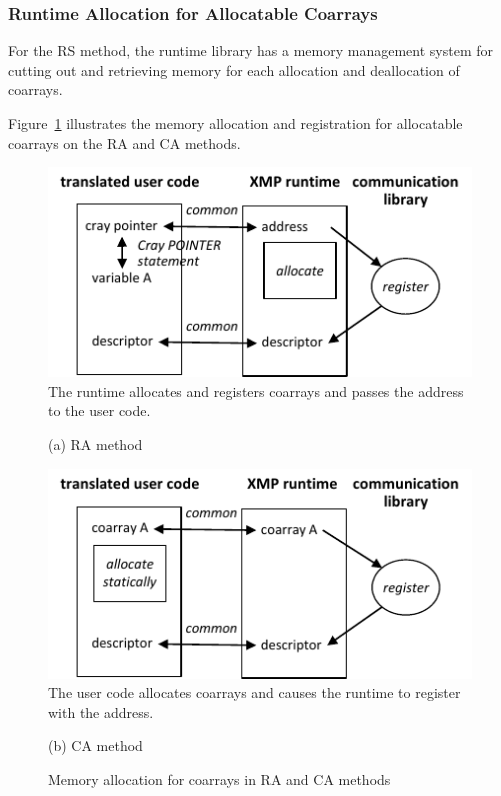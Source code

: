 \subsubsection{Runtime Allocation for Allocatable Coarrays}

For the RS method, the runtime library has a memory management system for
cutting out and retrieving memory for each allocation and deallocation of 
coarrays.

Figure~\ref{fig:register-RA-CA} illustrates the memory allocation and registration
for allocatable coarrays on the RA and CA methods. 

\begin{figure}
 \begin{center}
  \includegraphics[scale=0.9, trim=0mm 0mm 0mm 0mm, clip]{figs/register-RA-tmp.pdf}\\
The runtime allocates and registers coarrays and passes the address to the user code.
 \end{center}
 \begin{center}
(a) RA method
 \end{center}
 \begin{center}
  \includegraphics[scale=0.9, trim=0mm 0mm 0mm 0mm, clip]{figs/register-CA-tmp.pdf}\\
The user code allocates coarrays and causes the runtime to register with the address.
 \end{center}
 \begin{center}
(b) CA method
 \end{center}
 \caption{Memory allocation for coarrays in RA and CA methods}
 \label{fig:register-RA-CA}
\end{figure}

